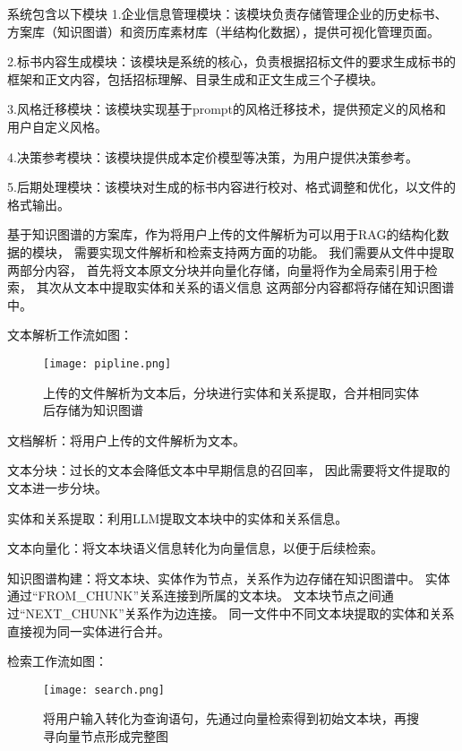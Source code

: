 \documentclass{xmu}
\begin{document}
系统包含以下模块
1.企业信息管理模块：该模块负责存储管理企业的历史标书、方案库（知识图谱）和资历库素材库（半结构化数据），提供可视化管理页面。

2.标书内容生成模块：该模块是系统的核心，负责根据招标文件的要求生成标书的框架和正文内容，包括招标理解、目录生成和正文生成三个子模块。

3.风格迁移模块：该模块实现基于prompt的风格迁移技术，提供预定义的风格和用户自定义风格。

4.决策参考模块：该模块提供成本定价模型等决策，为用户提供决策参考。

5.后期处理模块：该模块对生成的标书内容进行校对、格式调整和优化，以文件的格式输出。


基于知识图谱的方案库，作为将用户上传的文件解析为可以用于RAG的结构化数据的模块，
需要实现文件解析和检索支持两方面的功能。
我们需要从文件中提取两部分内容，
首先将文本原文分块并向量化存储，向量将作为全局索引用于检索，
其次从文本中提取实体和关系的语义信息
这两部分内容都将存储在知识图谱中。

文本解析工作流如图：

\begin{figure}[!htb]
    \centering
    \texttt{[image: pipline.png]}\\
    \caption{上传的文件解析为文本后，分块进行实体和关系提取，合并相同实体后存储为知识图谱}\label{}
\end{figure}

文档解析：将用户上传的文件解析为文本。\par
文本分块：过长的文本会降低文本中早期信息的召回率\cite{Long}，
因此需要将文件提取的文本进一步分块。\par
实体和关系提取：利用LLM提取文本块中的实体和关系信息。\par
文本向量化：将文本块语义信息转化为向量信息，以便于后续检索。\par
知识图谱构建：将文本块、实体作为节点，关系作为边存储在知识图谱中。
实体通过“FROM\_CHUNK”关系连接到所属的文本块。
文本块节点之间通过“NEXT\_CHUNK”关系作为边连接。
同一文件中不同文本块提取的实体和关系直接视为同一实体进行合并。

检索工作流如图：

\begin{figure}[!htb]
    \centering
    \texttt{[image: search.png]}\\
    \caption{将用户输入转化为查询语句，先通过向量检索得到初始文本块，再搜寻向量节点形成完整图}\label{}
\end{figure}
\end{document}
